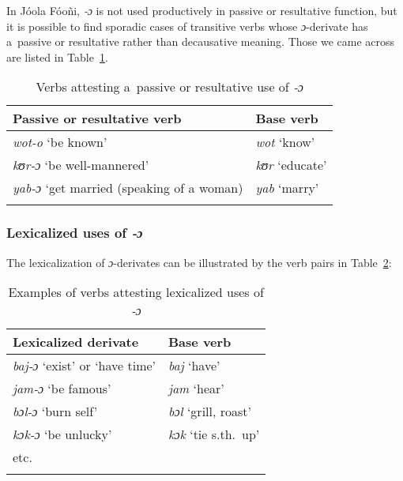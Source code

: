 \documentclass[output=paper]{langscibook}
\begin{document}
In Jóola Fóoñi, \textit{‑ɔ} is not used productively in passive or resultative
function, but it is possible to find sporadic cases of transitive verbs whose
\textit{ɔ}-derivate has a~passive or resultative rather than decausative meaning.
Those we came across are listed in Table~\ref{tab:Creissels:passive-o}.

\begin{table}[ht]
  \centering
  \begin{tabular}{ll}
    \lsptoprule
    {Passive or resultative verb} & {Base verb} \\
    \hline
    \textit{wot-o} `be known' & \textit{wot} `know' \\
    \textit{kʊr-ɔ} `be well-mannered' & \textit{kʊr} `educate' \\
    \textit{yab-ɔ} `get married (speaking of a woman) & \textit{yab} `marry' \\
    \lspbottomrule
  \end{tabular}
  \caption{Verbs attesting a~passive or resultative use of \textit{‑ɔ}}%
  \label{tab:Creissels:passive-o}
\end{table}

\subsubsection{Lexicalized uses of \textit{‑ɔ}}%
\label{sec:Creissels:lexicalized-o}

The lexicalization of \textit{ɔ}-derivates can be illustrated by the verb pairs
in Table~\ref{tab:Creissels:lexicalized-o}:

\begin{table}[ht]
  \centering
  \begin{tabular}{ll}
    \lsptoprule
   {Lexicalized derivate} & {Base verb} \\
    \hline
    \textit{baj-ɔ} `exist' or `have time' & \textit{baj} `have' \\
    \textit{jam-ɔ} `be famous' & \textit{jam} `hear' \\
    \textit{bɔl-ɔ} `burn self' & \textit{bɔl} `grill, roast' \\
    \textit{kɔk-ɔ} `be unlucky' & \textit{kɔk} `tie s.th.\ up' \\
    etc. & \\
    \lspbottomrule
  \end{tabular}
  \caption{Examples of verbs attesting lexicalized uses of \textit{‑ɔ}}%
  \label{tab:Creissels:lexicalized-o}
\end{table}
\end{document}

